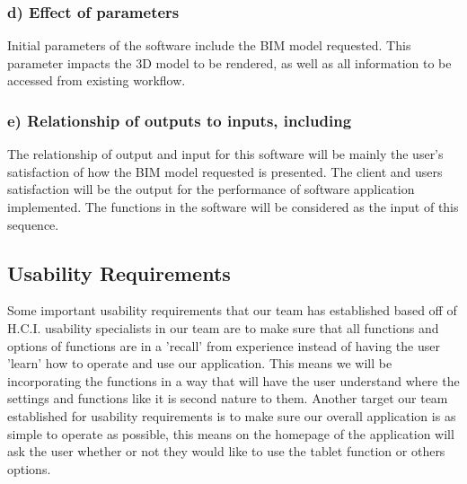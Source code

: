\documentclass[onecolumn, draftclsnofoot,10pt, compsoc]{IEEEtran}
\begin{document}
        \subsubsection*{d) Effect of parameters}
        Initial parameters of the software include the BIM model requested. This parameter impacts the 3D model to be rendered, as well as all information to be accessed from existing workflow.\par
         \subsubsection*{e) Relationship of outputs to inputs, including} %

        The relationship of output and input for this software will be mainly the user's satisfaction of how the BIM model requested is presented. The client and users satisfaction will be the output for the performance of software application implemented. The functions in the software will be considered as the input of this sequence.


    \subsection{Usability Requirements}
        Some important usability requirements that our team has established based off of H.C.I. usability specialists in our team are to make sure that all functions and options of functions are in a 'recall' from experience instead of having the user 'learn' how to operate and use our application. This means we will be incorporating the functions in a way that will have the user understand where the settings and functions like it is second nature to them. Another target our team established for usability requirements is to make sure our overall application is as simple to operate as possible, this means on the homepage of the application will ask the user whether or not they would like to use the tablet function or others options.
\end{document}
